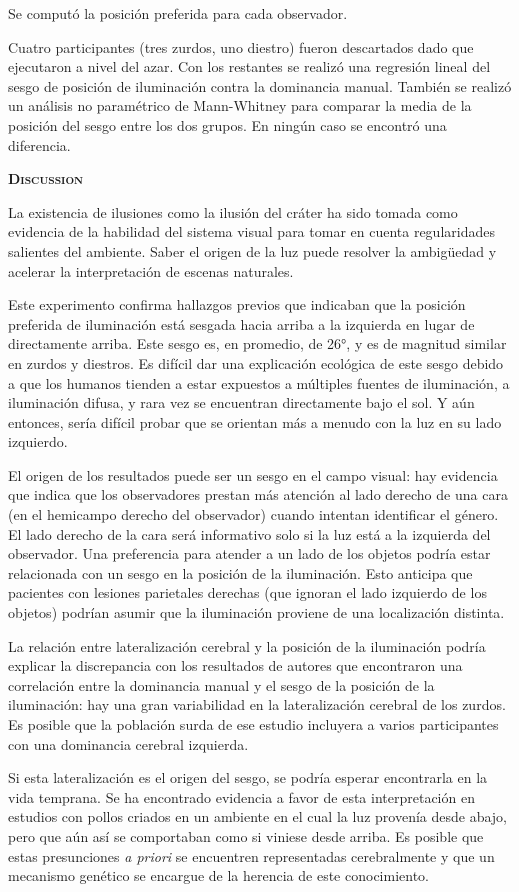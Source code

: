 \documentclass[a4paper,12pt]{article}
\begin{document}
Se computó la posición preferida para cada observador.

Cuatro participantes (tres zurdos, uno diestro) fueron descartados dado que ejecutaron a nivel del azar. Con los restantes se realizó una regresión lineal del sesgo de posición de iluminación contra la dominancia manual. También se realizó un análisis no paramétrico de Mann-Whitney para comparar la media de la posición del sesgo entre los dos grupos. En ningún caso se encontró una diferencia.

{\scshape\bfseries Discussion}

La existencia de ilusiones como la ilusión del cráter ha sido tomada como evidencia de la habilidad del sistema visual para tomar en cuenta regularidades salientes del ambiente. Saber el origen de la luz puede resolver la ambigüedad y acelerar la interpretación de escenas naturales.

Este experimento confirma hallazgos previos que indicaban que la posición preferida de iluminación está sesgada hacia arriba a la izquierda en lugar de directamente arriba. Este sesgo es, en promedio, de 26°, y es de magnitud similar en zurdos y diestros. Es difícil dar una explicación ecológica de este sesgo debido a que los humanos tienden a estar expuestos a múltiples fuentes de iluminación, a iluminación difusa, y rara vez se encuentran directamente bajo el sol. Y aún entonces, sería difícil probar que se orientan más a menudo con la luz en su lado izquierdo.

El origen de los resultados puede ser un sesgo en el campo visual: hay evidencia que indica que los observadores prestan más atención al lado derecho de una cara (en el hemicampo derecho del observador) cuando intentan identificar el género. El lado derecho de la cara será informativo solo si la luz está a la izquierda del observador. Una preferencia para atender a un lado de los objetos podría estar relacionada con un sesgo en la posición de la iluminación. Esto anticipa que pacientes con lesiones parietales derechas (que ignoran el lado izquierdo de los objetos) podrían asumir que la iluminación proviene de una localización distinta.

La relación entre lateralización cerebral y la posición de la iluminación podría explicar la discrepancia con los resultados de autores que encontraron una correlación entre la dominancia manual y el sesgo de la posición de la iluminación: hay una gran variabilidad en la lateralización cerebral de los zurdos. Es posible que la población surda de ese estudio incluyera a varios participantes con una dominancia cerebral izquierda.

Si esta lateralización es el origen del sesgo, se podría esperar encontrarla en la vida temprana. Se ha encontrado evidencia a favor de esta interpretación en estudios con pollos criados en un ambiente en el cual la luz provenía desde abajo, pero que aún así se comportaban como si viniese desde arriba. Es posible que estas presunciones {\itshape a priori} se encuentren representadas cerebralmente y que un mecanismo genético se encargue de la herencia de este conocimiento.
\end{document}

